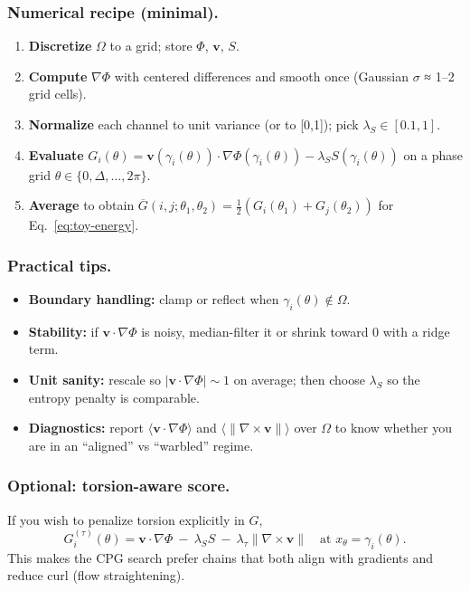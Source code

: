 \documentclass[a4paper,11pt]{article}
\begin{document}
\subsubsection{Numerical recipe (minimal).}
\begin{enumerate}
\item \textbf{Discretize} $\Omega$ to a grid; store $\Phi$, $\mathbf v$, $S$.
\item \textbf{Compute} $\nabla\Phi$ with centered differences and smooth once (Gaussian $\sigma$ ≈ 1–2 grid cells).
\item \textbf{Normalize} each channel to unit variance (or to [0,1]); pick $\lambda_S\in[0.1,1]$.
\item \textbf{Evaluate} $G_i(\theta)=\mathbf v(\gamma_i(\theta))\cdot \nabla\Phi(\gamma_i(\theta))-\lambda_S S(\gamma_i(\theta))$ on a phase grid $\theta\in\{0,\Delta,\dots,2\pi\}$.
\item \textbf{Average} to obtain $\overline{G}(i,j;\theta_1,\theta_2)=\tfrac{1}{2}(G_i(\theta_1)+G_j(\theta_2))$ for Eq.~\eqref{eq:toy-energy}.
\end{enumerate}

\subsubsection{Practical tips.}
\begin{itemize}
\item \textbf{Boundary handling:} clamp or reflect when $\gamma_i(\theta)\notin\Omega$.
\item \textbf{Stability:} if $\mathbf v\cdot\nabla\Phi$ is noisy, median-filter it or shrink toward 0 with a ridge term.
\item \textbf{Unit sanity:} rescale so $| \mathbf v\cdot\nabla\Phi |\sim 1$ on average; then choose $\lambda_S$ so the entropy penalty is comparable.
\item \textbf{Diagnostics:} report $\langle \mathbf v\cdot\nabla\Phi\rangle$ and $\langle \|\nabla\times\mathbf v\|\rangle$ over $\Omega$ to know whether you are in an “aligned” vs “warbled” regime.
\end{itemize}

\subsubsection{Optional: torsion-aware score.}
If you wish to penalize torsion explicitly in $G$,
\begin{equation}
G_i^{(\tau)}(\theta)=
\mathbf v\!\cdot\!\nabla\Phi\ -\ \lambda_S S\ -\ \lambda_\tau \big\|\nabla\times\mathbf v\big\|
\quad\text{at }x_\theta=\gamma_i(\theta).
\end{equation}
This makes the CPG search prefer chains that both align with gradients and reduce curl (flow straightening).
\end{document}
